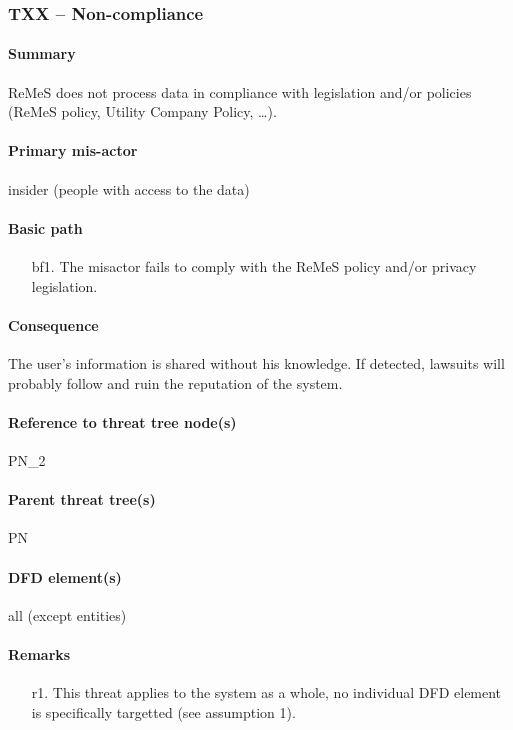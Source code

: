 \subsubsection{TXX -- Non-compliance} %
\paragraph{Summary} ReMeS does not process data in compliance with legislation
and/or policies (ReMeS policy, Utility Company Policy, \ldots).

\paragraph{Primary mis-actor} insider (people with access to the data)

\paragraph{Basic path}
\begin{enumerate}
	\item[bf1.] The misactor fails to comply with the ReMeS policy and/or
	privacy legislation.
\end{enumerate}

\paragraph{Consequence} The user's information is shared without his knowledge.
If detected, lawsuits will probably follow and ruin the reputation of the
system.

\paragraph{Reference to threat tree node(s)} PN_2

\paragraph{Parent threat tree(s)} PN

\paragraph{DFD element(s)} all (except entities)

\paragraph{Remarks}
\begin{enumerate}
     \item[r1.] This threat applies to the system as a whole, no individual DFD
     element is specifically targetted (see assumption 1).
\end{enumerate}